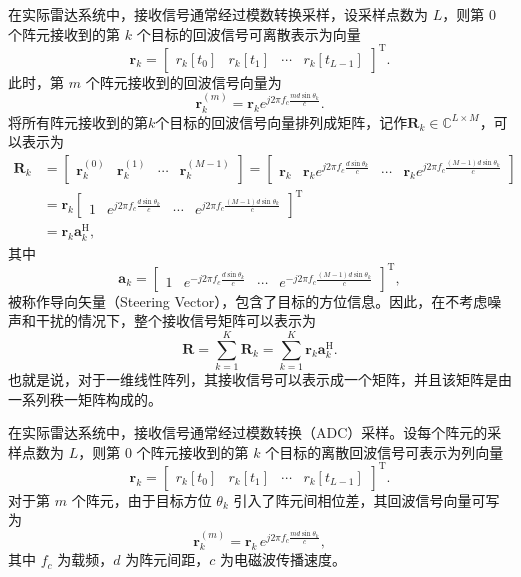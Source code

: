 在实际雷达系统中，接收信号通常经过模数转换采样，设采样点数为 \( L \)，则第 $0$ 个阵元接收到的第 \( k \) 个目标的回波信号可离散表示为向量
\[
    \bm{r}_k = \begin{bmatrix}
        r_k[t_0] & r_k[t_1] & \cdots & r_k[t_{L-1}]
    \end{bmatrix}^{\mathrm{T}}.
\]
此时，第 \( m \) 个阵元接收到的回波信号向量为
\[
    \bm{r}^{(m)}_k = \bm{r}_k e^{j 2 \pi f_c \frac{m d \sin\theta_k}{c}}.
\]
将所有阵元接收到的第\( k \)个目标的回波信号向量排列成矩阵，记作\( \mathbf{R}_k \in \mathbb{C}^{L \times M} \)，可以表示为
\[
    \begin{split}
        \mathbf{R}_k & = \begin{bmatrix}
                             \bm{r}_k^{(0)} & \bm{r}_k^{(1)} & \cdots & \bm{r}_k^{(M-1)}
                         \end{bmatrix} = \begin{bmatrix}
                                             \bm{r}_k & \bm{r}_k e^{j 2 \pi f_c \frac{d \sin\theta_k}{c}} & \cdots & \bm{r}_k e^{j 2 \pi f_c \frac{(M-1) d \sin\theta_k}{c}}
                                         \end{bmatrix} \\
                     & = \bm{r}_k \begin{bmatrix}
                                      1 & e^{j 2 \pi f_c \frac{d \sin\theta_k}{c}} & \cdots & e^{j 2 \pi f_c \frac{(M-1) d \sin\theta_k}{c}}
                                  \end{bmatrix}^{\mathrm{T}}                                 \\
                     & = \bm{r}_k \bm{a}^{\mathrm{H}}_k,
    \end{split}
\]
其中
\[
    \bm{a}_k = \begin{bmatrix}
        1 & e^{-j 2 \pi f_c \frac{d \sin\theta_k}{c}} & \cdots & e^{-j 2 \pi f_c \frac{(M-1) d \sin\theta_k}{c}}
    \end{bmatrix}^{\mathrm{T}},
\]
被称作导向矢量（Steering Vector），包含了目标的方位信息。因此，在不考虑噪声和干扰的情况下，整个接收信号矩阵可以表示为
\[
    \mathbf{R} = \sum_{k=1}^{K} \mathbf{R}_k = \sum_{k=1}^{K} \bm{r}_k \bm{a}^{\mathrm{H}}_k.
\]
也就是说，对于一维线性阵列，其接收信号可以表示成一个矩阵，并且该矩阵是由一系列秩一矩阵构成的。

在实际雷达系统中，接收信号通常经过模数转换（ADC）采样。设每个阵元的采样点数为 \(L\)，则第 \(0\) 个阵元接收到的第 \(k\) 个目标的离散回波信号可表示为列向量
\[
    \bm{r}_k =
    \begin{bmatrix}
        r_k[t_0] & r_k[t_1] & \cdots & r_k[t_{L-1}]
    \end{bmatrix}^{\mathrm{T}}.
\]
对于第 \(m\) 个阵元，由于目标方位 \(\theta_k\) 引入了阵元间相位差，其回波信号向量可写为
\[
    \bm{r}^{(m)}_k
    = \bm{r}_k \, e^{j 2 \pi f_c \frac{m d \sin\theta_k}{c}},
\]
其中 \(f_c\) 为载频，\(d\) 为阵元间距，\(c\) 为电磁波传播速度。

